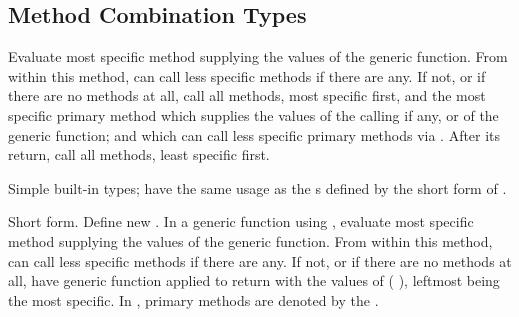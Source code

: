 \subsection[Method Combi- nation Types]{Method Combination Types} 
\label{section:Method Combination Types}
\begin{LIST}{1cm}

  {
  Evaluate most specific  method supplying the values of
  the generic function. From within this method, 
  can call less specific  methods if there are any. If
  not, or if there are no  methods at all, call all
   methods, most specific first, and the most specific
  primary method which supplies the values of the calling
   if any, or of the generic function; and which
  can call less specific primary methods via
  . After its return, call all 
  methods, least specific first.
  }

  {
    Simple built-in  types; have the same
    usage as the
    s defined by the short form of
    . 
  }

  {
  Short form. Define new 
  . In a generic function using ,
  evaluate most specific  method supplying the values of
  the generic function. From within this method, 
  can call less specific  methods if there are any. If
  not, or if there are no  methods at all,
  have generic function applied to  return with the
  values of ( ), leftmost  being the most
  specific. In , primary methods are denoted by the
   . 
    }


\end{LIST}
